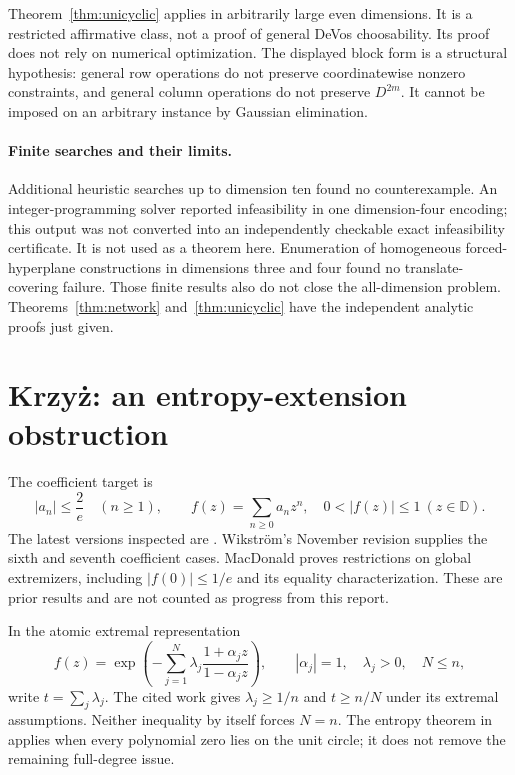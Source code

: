 \documentclass[11pt,a4paper]{article}
\newcommand{\D}{\mathbb D}
\begin{document}
Theorem~\ref{thm:unicyclic} applies in arbitrarily large even dimensions.
It is a restricted affirmative class, not a proof of general DeVos
choosability. Its proof does not rely on numerical optimization.
The displayed block form is a structural hypothesis: general row
operations do not preserve coordinatewise nonzero constraints, and
general column operations do not preserve $D^{2m}$. It cannot be imposed
on an arbitrary instance by Gaussian elimination.

\paragraph{Finite searches and their limits.}
Additional heuristic searches up to dimension ten found no counterexample.
An integer-programming solver reported infeasibility in one dimension-four
encoding; this output was not converted into an independently checkable
exact infeasibility certificate. It is not used as a theorem here.
Enumeration of homogeneous forced-hyperplane constructions in dimensions
three and four found no translate-covering failure. Those finite results
also do not close the all-dimension problem. Theorems~\ref{thm:network}
and~\ref{thm:unicyclic} have the independent analytic proofs just given.

\section{Krzy\.{z}: an entropy-extension obstruction}

The coefficient target is
\begin{equation}\label{eq:krzyz}
 |a_n|\le\frac2e\quad(n\ge1),\qquad
 f(z)=\sum_{n\ge0}a_nz^n,\quad 0<|f(z)|\le1\ (z\in\D).
\end{equation}
The latest versions inspected are \cite{Wikstrom,MacDonald,LeiZhang}.
Wikstr\"om's November revision supplies the sixth and seventh coefficient
cases. MacDonald proves restrictions on global extremizers, including
$|f(0)|\le1/e$ and its equality characterization. These are prior
results and are not counted as progress from this report.

In the atomic extremal representation
\[
 f(z)=\exp\left(-\sum_{j=1}^{N}\lambda_j
                  \frac{1+\alpha_jz}{1-\alpha_jz}\right),
 \qquad |\alpha_j|=1,\quad \lambda_j>0,\quad N\le n,
\]
write $t=\sum_j\lambda_j$. The cited work gives
$\lambda_j\ge1/n$ and $t\ge n/N$ under its extremal assumptions.
Neither inequality by itself forces $N=n$. The entropy theorem in
\cite{LeiZhang} applies when every polynomial zero lies on the unit
circle; it does not remove the remaining full-degree issue.
\end{document}
